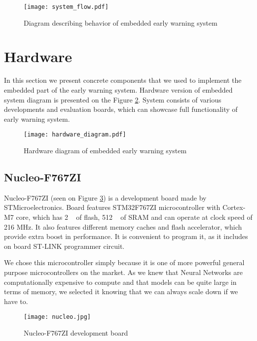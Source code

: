 \begin{figure}[ht]
        \centering
        \texttt{[image: system\_flow.pdf]} 
        \caption{ Diagram describing behavior of embedded early warning system} 
        \label{system_flow}
\end{figure}


\section{ Hardware}

In this section we present concrete components that we used to implement the embedded part of the early warning system.
Hardware version of embedded system diagram is presented on the Figure \ref{hardware_diagram}.
System consists of various developments and evaluation boards, which can showcase full functionality of early warning system.

\begin{figure}[ht]
        \centering
        \texttt{[image: hardware\_diagram.pdf]} 
        \caption{ Hardware diagram of embedded early warning system} 
        \label{hardware_diagram}
\end{figure}


\subsection{ Nucleo-F767ZI}

Nucleo-F767ZI (seen on Figure \ref{nucleo}) is a development board made by STMicroelectronics.
Board features STM32F767ZI microcontroller with Cortex-M7 core, which has 2 \si{\mega\byte} of flash, 512 \si{\kilo\byte} of SRAM and can operate at clock speed of 216 \si{\mega\hertz}.
It also features different memory caches and flash accelerator, which provide extra boost in performance.
It is convenient to program it, as it includes on board ST-LINK programmer circuit.

We chose this microcontroller simply because it is one of more powerful general purpose microcontrollers on the market.
As we knew that Neural Networks are computationally expensive to compute and that models can be quite large in terms of memory, we selected it knowing that we can always scale down if we have to.

\begin{figure}[ht]
        \centering
        \texttt{[image: nucleo.jpg]} 
        \caption{ Nucleo-F767ZI development board} 
        \label{nucleo}
\end{figure}



